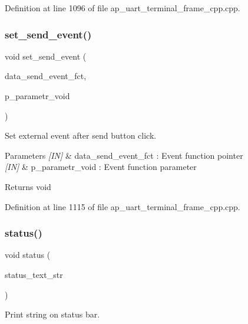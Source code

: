 Definition at line 1096 of file ap\+\_\+uart\+\_\+terminal\+\_\+frame\+\_\+cpp.\+cpp.

\mbox{\label{group___u_a_r_t__terminal_ga40fe93386e57619826bc2f50a27dbc0c}} 
\subsubsection{set\_send\_event()}
{\footnotesize\ttfamily void set\+\_\+send\+\_\+event (\begin{DoxyParamCaption}\item[{\textbf{ send\+\_\+event\+\_\+fct}}]{data\+\_\+send\+\_\+event\+\_\+fct,  }\item[{void $\ast$}]{p\+\_\+parametr\+\_\+void }\end{DoxyParamCaption})}



Set external event after send button click. 


\begin{DoxyParams}{Parameters}
{\em \mbox{[}\+I\+N\mbox{]}} & data\+\_\+send\+\_\+event\+\_\+fct \+: Event function pointer \\
\hline
{\em \mbox{[}\+I\+N\mbox{]}} & p\+\_\+parametr\+\_\+void \+: Event function parameter \\
\hline
\end{DoxyParams}
\begin{DoxyReturn}{Returns}
void 
\end{DoxyReturn}


Definition at line 1115 of file ap\+\_\+uart\+\_\+terminal\+\_\+frame\+\_\+cpp.\+cpp.

\mbox{\label{group___u_a_r_t__terminal_gac13ab4f21ab16785861da45f063ce763}} 
\subsubsection{status()}
{\footnotesize\ttfamily void status (\begin{DoxyParamCaption}\item[{wx\+String}]{status\+\_\+text\+\_\+str }\end{DoxyParamCaption})}



Print string on status bar. 



